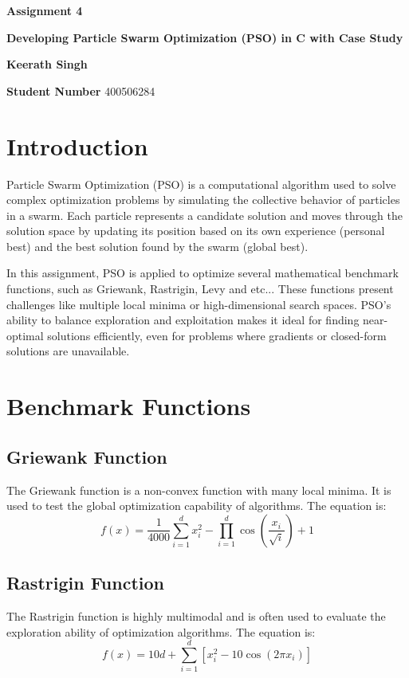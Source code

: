 \documentclass[12pt]{article}
\begin{document}
	
	\justifying
	
	\begin{center}
		\textbf{{\large Assignment 4}}
		
		\textbf{Developing Particle Swarm Optimization (PSO) in C with Case Study} 
		
		\textbf{Keerath Singh}
		
		\textbf{Student Number} 400506284
	\end{center}
	

	
	
	
	\section{Introduction}
	
	
	
	Particle Swarm Optimization (PSO) is a computational algorithm used to solve complex optimization problems by simulating the collective behavior of particles in a swarm. Each particle represents a candidate solution and moves through the solution space by updating its position based on its own experience (personal best) and the best solution found by the swarm (global best).

In this assignment, PSO is applied to optimize several mathematical benchmark functions, such as Griewank, Rastrigin, Levy and etc... These functions present challenges like multiple local minima or high-dimensional search spaces. PSO's ability to balance exploration and exploitation makes it ideal for finding near-optimal solutions efficiently, even for problems where gradients or closed-form solutions are unavailable.
	
	


\section{Benchmark Functions}

\subsection{Griewank Function}
The Griewank function is a non-convex function with many local minima. It is used to test the global optimization capability of algorithms. The equation is:
\[
f(x) = \frac{1}{4000} \sum_{i=1}^d x_i^2 - \prod_{i=1}^d \cos\left(\frac{x_i}{\sqrt{i}}\right) + 1
\]

\subsection{Rastrigin Function}
The Rastrigin function is highly multimodal and is often used to evaluate the exploration ability of optimization algorithms. The equation is:
\[
f(x) = 10d + \sum_{i=1}^d \left[x_i^2 - 10\cos(2\pi x_i)\right]
\]
\end{document}
